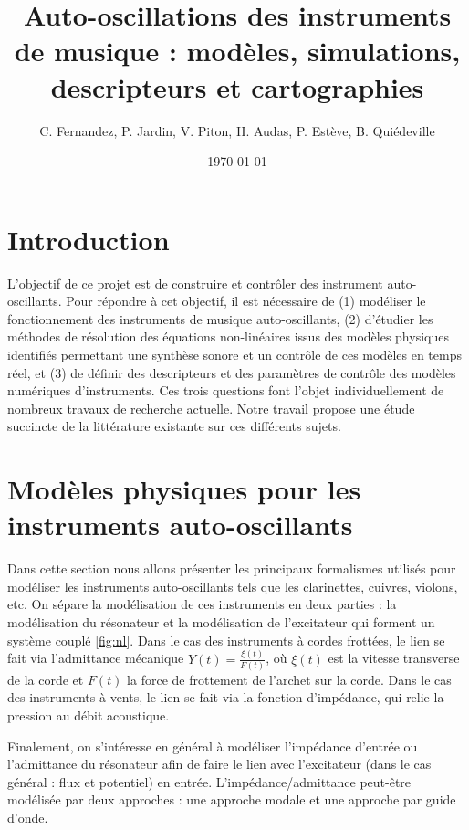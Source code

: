 \documentclass[atiam, article]{rapport} %
\title{Auto-oscillations des instruments de musique : modèles, simulations, descripteurs et cartographies}
\author{C. Fernandez, P. Jardin, V. Piton, H. Audas, P. Estève, B. Quiédeville} %
\date{\today}
\begin{document}
\maketitle

\tocpage

\section*{Introduction}
L'objectif de ce projet est de construire et contrôler des instrument auto-oscillants. Pour répondre à cet objectif, il est nécessaire de (1) modéliser le fonctionnement des instruments de musique auto-oscillants, (2) d'étudier les méthodes de résolution des équations non-linéaires issus des modèles physiques identifiés permettant une synthèse sonore et un contrôle de ces modèles en temps réel, et (3) de définir des descripteurs et des paramètres de contrôle des modèles numériques d'instruments. Ces trois questions font l'objet individuellement de nombreux travaux de recherche actuelle. Notre travail propose une étude succincte de la littérature existante sur ces différents sujets. 


\section{Modèles physiques pour les instruments auto-oscillants}\label{sec:models physiques}
Dans cette section nous allons présenter les principaux formalismes utilisés pour modéliser les instruments auto-oscillants tels que les clarinettes, cuivres, violons, etc. 
On sépare la modélisation de ces instruments en deux parties : la modélisation du résonateur et la modélisation de l'excitateur qui forment un système couplé \ref{fig:nl}. Dans le cas des instruments à cordes frottées, le lien se fait via l'admittance mécanique $Y(t)=\frac{\xi(t)}{F(t)}$, où $\xi(t)$ est la vitesse transverse de la corde et $F(t)$ la force de frottement de l'archet sur la corde. Dans le cas des instruments à vents, le lien se fait via la fonction d'impédance, qui relie la pression au débit acoustique. 

Finalement, on s'intéresse en général à modéliser l'impédance d'entrée ou l'admittance du résonateur afin de faire le lien avec l'excitateur (dans le cas général : flux et potentiel) en entrée. L'impédance/admittance peut-être modélisée par deux approches : une approche modale et une approche par guide d'onde. 
\end{document}
